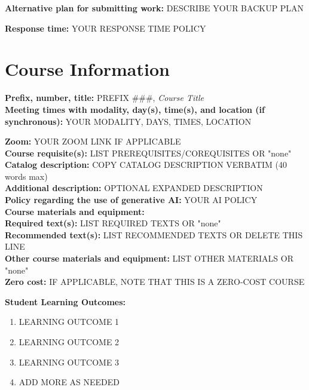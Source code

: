 \documentclass[12pt]{article}
\begin{document}
\vspace{0.5em}
\noindent \textbf{Alternative plan for submitting work:} DESCRIBE YOUR BACKUP PLAN

\vspace{0.5em}
\noindent \textbf{Response time:} YOUR RESPONSE TIME POLICY

\section*{Course Information}
\noindent \textbf{Prefix, number, title:} PREFIX \#\#\#, \textit{Course Title} \\
\noindent \textbf{Meeting times with modality, day(s), time(s), and location (if synchronous):} 
YOUR MODALITY, DAYS, TIMES, LOCATION

\vspace{0.5em}
\noindent \textbf{Zoom:} YOUR ZOOM LINK IF APPLICABLE \\
\noindent \textbf{Course requisite(s):} LIST PREREQUISITES/COREQUISITES OR "none" \\
\noindent \textbf{Catalog description:} COPY CATALOG DESCRIPTION VERBATIM (40 words max) \\
\noindent \textbf{Additional description:} OPTIONAL EXPANDED DESCRIPTION \\
\noindent \textbf{Policy regarding the use of generative AI:} YOUR AI POLICY \\
\noindent \textbf{Course materials and equipment:} ~ \\
\noindent \textbf{Required text(s):} LIST REQUIRED TEXTS OR "none" \\
\noindent \textbf{Recommended text(s):} LIST RECOMMENDED TEXTS OR DELETE THIS LINE \\
\noindent \textbf{Other course materials and equipment:} LIST OTHER MATERIALS OR "none" \\
\noindent \textbf{Zero cost:} IF APPLICABLE, NOTE THAT THIS IS A ZERO-COST COURSE

\vspace{1em}
\noindent \textbf{Student Learning Outcomes:}
\begin{enumerate}
\item LEARNING OUTCOME 1
\item LEARNING OUTCOME 2
\item LEARNING OUTCOME 3
\item ADD MORE AS NEEDED
\end{enumerate}
\end{document}
